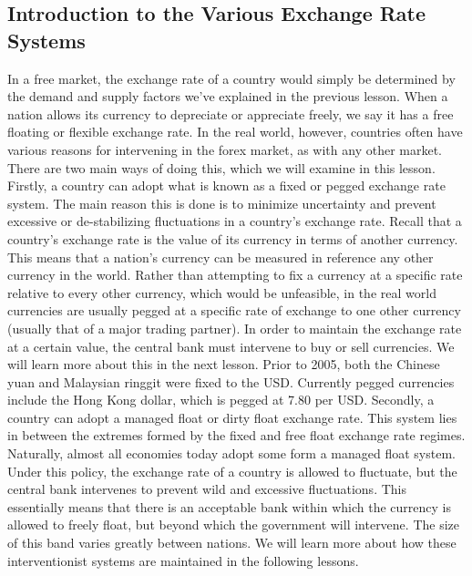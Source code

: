 \documentclass[DIV=classic,11pt,numbers=noenddot,listof=totoc,bibliography=totoc,parskip]{scrartcl}
\begin{document}
\subsection{Introduction to the Various Exchange Rate Systems}
In a free market, the exchange rate of a country would simply be determined by the demand and supply factors we’ve explained in the previous lesson. When a nation allows its currency to depreciate or appreciate freely, we say it has a free floating or flexible exchange rate. In the real world, however, countries often have various reasons for intervening in the forex market, as with any other market. There are two main ways of doing this, which we will examine in this lesson. Firstly, a country can adopt what is known as a fixed or pegged exchange rate system. The main reason this is done is to minimize uncertainty and prevent excessive or de-stabilizing fluctuations in a country’s exchange rate. Recall that a country’s exchange rate is the value of its currency in terms of another currency. This means that a nation’s currency can be measured in reference any other currency in the world. Rather than attempting to fix a currency at a specific rate relative to every other currency, which would be unfeasible, in the real world currencies are usually pegged at a specific rate of exchange to one other currency (usually that of a major trading partner). In order to maintain the exchange rate at a certain value, the central bank must intervene to buy or sell currencies. We will learn more about this in the next lesson. Prior to 2005, both the Chinese yuan and Malaysian ringgit were fixed to the USD. Currently pegged currencies include the Hong Kong dollar, which is pegged at 7.80 per USD. Secondly, a country can adopt a managed float or dirty float exchange rate. This system lies in between the extremes formed by the fixed and free float exchange rate regimes. Naturally, almost all economies today adopt some form a managed float system.  Under this policy, the exchange rate of a country is allowed to fluctuate, but the central bank intervenes to prevent wild and excessive fluctuations. This essentially means that there is an acceptable bank within which the currency is allowed to freely float, but beyond which the government will intervene. The size of this band varies greatly between nations. We will learn more about how these interventionist systems are maintained in the following lessons.
\end{document}
